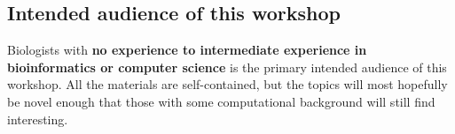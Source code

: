\documentclass[12pt,letterpaper]{article}
\begin{document}
\subsection{Intended audience of this workshop}

Biologists with \textbf{no experience to intermediate experience in bioinformatics or computer science} is the primary intended audience of this workshop. All the materials are self-contained, but the topics will most hopefully be novel enough that those with some computational background will still find interesting.
\end{document}
